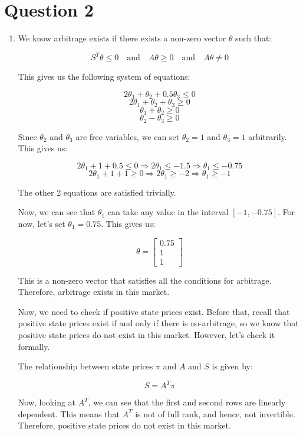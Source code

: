 \documentclass[a4paper]{article}
\begin{document}
\vspace{15mm}
\section*{Question 2}
\begin{enumerate}[label=(\alph*)]
    \item We know arbitrage exists if there exists a non-zero vector $\theta$ such that:

    \[ S^{T}\theta \leq 0 \quad \text{and} \quad A\theta \geq 0 \quad \text{and} \quad A\theta \neq 0 \]

    This gives us the following system of equations:

    \[ 2\theta_{1} + \theta_{2} + 0.5\theta_{3} \leq 0 \]
    \[ 2\theta_{1} + \theta_{2} + \theta_{3} \geq 0 \]
    \[ \theta_{1} + \theta_{2} \geq 0 \]
    \[ \theta_{2} - \theta_{3} \geq 0 \]

    Since $\theta_{2}$ and $\theta_{3}$ are free variables, we can set $\theta_{2} = 1$ and $\theta_{3} = 1$ arbitrarily. This gives us:

    \[ 2\theta_{1} + 1 + 0.5 \leq 0 \Rightarrow 2\theta_{1} \leq -1.5 \Rightarrow \theta_{1} \leq -0.75 \]
    \[ 2\theta_{1} + 1 + 1 \geq 0 \Rightarrow 2\theta_{1} \geq -2 \Rightarrow \theta_{1} \geq -1 \]

    The other 2 equations are satisfied trivially.

    Now, we can see that $\theta_{1}$ can take any value in the interval $[-1, -0.75]$. For now, let's set $\theta_{1} = 0.75$. This gives us:

    \[ \theta = \begin{bmatrix} 0.75 \\ 1 \\ 1 \end{bmatrix} \]

    This is a non-zero vector that satisfies all the conditions for arbitrage. Therefore, arbitrage exists in this market.

    Now, we need to check if positive state prices exist. Before that, recall that positive state prices exist if and only if there is no-arbitrage, so we know that positive state prices do not exist in this market. However, let's check it formally.

    The relationship between state prices $\pi$ and $A$ and $S$ is given by:

    \[ S = A^{T}\pi \]

    Now, looking at $A^{T}$, we can see that the first and second rows are linearly dependent. This means that $A^{T}$ is not of full rank, and hence, not invertible. Therefore, positive state prices do not exist in this market.



\end{enumerate}
\end{document}
